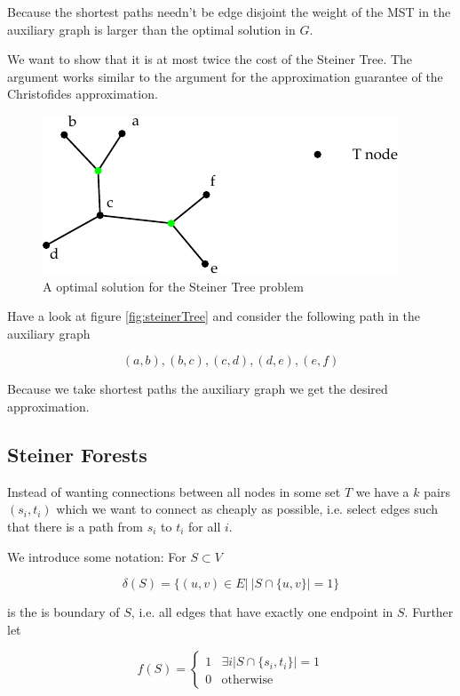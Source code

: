 Because the shortest paths needn't be edge disjoint the weight of the MST in the auxiliary graph is larger than the optimal solution in $G$.

We want to show that it is at most twice the cost of the Steiner Tree. The argument works similar to the argument for the approximation guarantee of the Christofides approximation.

\begin{figure}[hbt]
\begin{center}
\includegraphics{./images/steinerTree}
\end{center}
\caption{A optimal solution for the Steiner Tree problem}
\end{figure}

Have a look at figure \ref{fig:steinerTree} and consider the following path in the auxiliary graph

\[(a,b),(b,c),(c,d),(d,e),(e,f)\]

Because we take shortest paths the auxiliary graph we get the desired approximation.

\subsection{Steiner Forests}

Instead of wanting connections between all nodes in some set $T$ we have a $k$ pairs $(s_i,t_i)$ which we want to connect as cheaply as possible, i.e. select edges such that there is a path from $s_i$ to $t_i$ for all $i$.

We introduce some notation: For $S\subset V$

\[\delta(S) = \{(u,v)\in E |\ |S\cap \{u,v\}| = 1\}\]

is the is boundary of $S$, i.e. all edges that have exactly one endpoint in $S$. Further let 

\[f(S) = \begin{cases}
1 & \exists i |S \cap \{s_i,t_i\}| =1\\
0 & \text{otherwise}
\end{cases}\]

